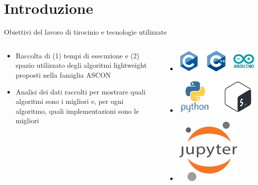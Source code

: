 \section{Introduzione}


\begin{frame}{Obiettivi del lavoro di tirocinio e tecnologie utilizzate}

\begin{columns}

\begin{column}{0.5\textwidth}

\begin{itemize}[<+->]
    \item Raccolta di (1) tempi di esecuzione e (2) spazio utilizzato degli algoritmi lightweight proposti nella famiglia ASCON
    \item Analisi dei dati raccolti per mostrare quali algoritmi sono i migliori e, per ogni algoritmo, quali implementazioni sono le migliori
\end{itemize}

\end{column}

\begin{column}{0.5\textwidth}
    
\begin{itemize}[<+->]
    \item[] \includegraphics[height=0.15\textwidth]{images/board.png} \vspace{0.5cm}
    \item[] \includegraphics[height=0.15\textwidth]{images/automation.png} \vspace{0.5cm}
    \item[] \includegraphics[height=0.15\textwidth]{images/plot.png}
\end{itemize}

\end{column}

\end{columns}

\end{frame}

